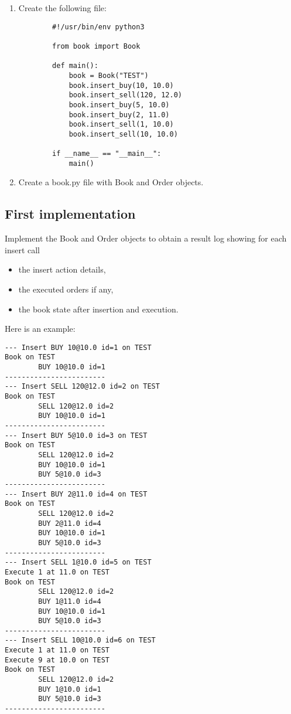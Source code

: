 \begin{enumerate}
    \item Create the following file:
        \begin{verbatim}
        #!/usr/bin/env python3

        from book import Book

        def main():
            book = Book("TEST")
            book.insert_buy(10, 10.0)
            book.insert_sell(120, 12.0)
            book.insert_buy(5, 10.0)
            book.insert_buy(2, 11.0)
            book.insert_sell(1, 10.0)
            book.insert_sell(10, 10.0)

        if __name__ == "__main__":
            main()
        \end{verbatim}
    \item Create a book.py file with Book and Order objects.
\end{enumerate}


\subsection{First implementation}

Implement the Book and Order objects to obtain a result log showing for each insert call
\begin{itemize}
    \item the insert action details,
    \item the executed orders if any,
    \item the book state after insertion and execution.
\end{itemize}

Here is an example:
\begin{verbatim}
--- Insert BUY 10@10.0 id=1 on TEST
Book on TEST
        BUY 10@10.0 id=1
------------------------
--- Insert SELL 120@12.0 id=2 on TEST
Book on TEST
        SELL 120@12.0 id=2
        BUY 10@10.0 id=1
------------------------
--- Insert BUY 5@10.0 id=3 on TEST
Book on TEST
        SELL 120@12.0 id=2
        BUY 10@10.0 id=1
        BUY 5@10.0 id=3
------------------------
--- Insert BUY 2@11.0 id=4 on TEST
Book on TEST
        SELL 120@12.0 id=2
        BUY 2@11.0 id=4
        BUY 10@10.0 id=1
        BUY 5@10.0 id=3
------------------------
--- Insert SELL 1@10.0 id=5 on TEST
Execute 1 at 11.0 on TEST
Book on TEST
        SELL 120@12.0 id=2
        BUY 1@11.0 id=4
        BUY 10@10.0 id=1
        BUY 5@10.0 id=3
------------------------
--- Insert SELL 10@10.0 id=6 on TEST
Execute 1 at 11.0 on TEST
Execute 9 at 10.0 on TEST
Book on TEST
        SELL 120@12.0 id=2
        BUY 1@10.0 id=1
        BUY 5@10.0 id=3
------------------------
\end{verbatim}

